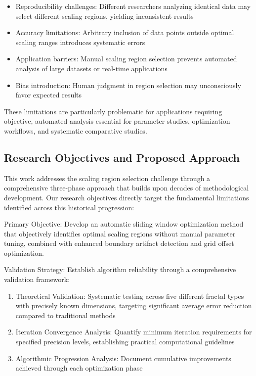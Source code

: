\documentclass[preprint,12pt]{elsarticle}
\def\textbf#1{#1}%
\begin{document}
\begin{itemize}
\item \textbf{Reproducibility challenges}: Different researchers analyzing identical data may select different scaling regions, yielding inconsistent results
\item \textbf{Accuracy limitations}: Arbitrary inclusion of data points outside optimal scaling ranges introduces systematic errors
\item \textbf{Application barriers}: Manual scaling region selection prevents automated analysis of large datasets or real-time applications
\item \textbf{Bias introduction}: Human judgment in region selection may unconsciously favor expected results
\end{itemize}

These limitations are particularly problematic for applications requiring objective, automated analysis essential for parameter studies, optimization workflows, and systematic comparative studies.

\subsection{Research Objectives and Proposed Approach}

This work addresses the scaling region selection challenge through a comprehensive three-phase approach that builds upon decades of methodological development. Our research objectives directly target the fundamental limitations identified across this historical progression:

\textbf{Primary Objective}: Develop an automatic sliding window optimization method that objectively identifies optimal scaling regions without manual parameter tuning, combined with enhanced boundary artifact detection and grid offset optimization.

\textbf{Validation Strategy}: Establish algorithm reliability through a comprehensive validation framework:

\begin{enumerate}
\item \textbf{Theoretical Validation}: Systematic testing across five different fractal types with precisely known dimensions, targeting significant average error reduction compared to traditional methods

\item \textbf{Iteration Convergence Analysis}: Quantify minimum iteration requirements for specified precision levels, establishing practical computational guidelines

\item \textbf{Algorithmic Progression Analysis}: Document cumulative improvements achieved through each optimization phase
\end{enumerate}
\end{document}
